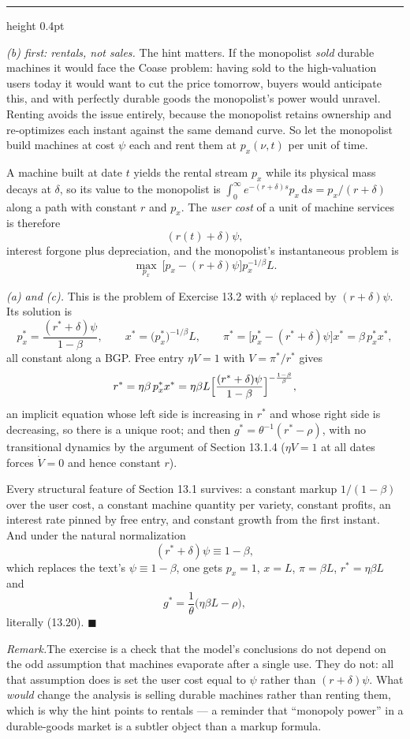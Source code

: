 \documentclass[11pt,letterpaper,reqno]{amsart}
\makeatletter
\newcommand{\dd}{\,\mathrm{d}}
\newcommand{\dt}[1]{\dot{#1}}
\newcommand{\as@head}[3]{%
  \par\addvspace{1.6ex}\penalty-200\relax
  \phantomsection
  \addcontentsline{toc}{subsection}{#1 #2\texorpdfstring{\ifx\relax#3\relax\else\quad #3\fi}{}}%
  {\color{RuleGrey}\hrule height 0.4pt}%
  \nobreak\vspace{0.8ex}\nobreak
  \noindent{\bfseries #1 #2}%
  \ifx\relax#3\relax\else\quad{\bfseries\itshape #3}\fi
  \par\nobreak\vspace{0.4ex}\nobreak
  \as@beginstatement
}
\newcommand{\as@beginstatement}{\begingroup\itshape\ignorespaces}
\newenvironment{aex}[2]{\as@head{Exercise}{#1}{#2}}{\par\addvspace{1.2ex}}
\newcommand{\rmk}[1]{%
  \par\vspace{0.6ex}%
  {\small\noindent\textit{Remark.}\hspace{0.5em}#1\par}%
  \vspace{0.4ex}%
}
\newcommand{\bk}[1]{\textup{\textsc{#1}}}
\renewcommand{\as@beginstatement}{\ignorespaces}
\makeatother
\begin{document}
\begin{aex}{13.23}{}
\emph{(b) first: rentals, not sales.}  The hint matters.  If the monopolist \emph{sold} durable
machines it would face the Coase problem: having sold to the high-valuation users today it would
want to cut the price tomorrow, buyers would anticipate this, and with perfectly durable goods the
monopolist's power would unravel.  Renting avoids the issue entirely, because the monopolist
retains ownership and re-optimizes each instant against the same demand curve.  So let the
monopolist build machines at cost $\psi$ each and rent them at $p_x(\nu,t)$ per unit of time.

A machine built at date $t$ yields the rental stream $p_x$ while its physical mass decays at
$\delta$, so its value to the monopolist is $\int_{0}^{\infty}e^{-(r+\delta)s}p_x\dd s=p_x/(r+\delta)$
along a path with constant $r$ and $p_x$.  The \emph{user cost} of a unit of machine services is
therefore
\[
(r(t)+\delta)\psi ,
\]
interest forgone plus depreciation, and the monopolist's instantaneous problem is
\[
\max_{p_x}\ \bigl[p_x-(r+\delta)\psi\bigr]p_x^{-1/\beta}L .
\]

\emph{(a) and (c).}  This is the problem of Exercise 13.2 with $\psi$ replaced by
$(r+\delta)\psi$.  Its solution is
\[
p_x^{*}=\frac{(r^{*}+\delta)\psi}{1-\beta},
\qquad
x^{*}=\bigl(p_x^{*}\bigr)^{-1/\beta}L,
\qquad
\pi^{*}=\bigl[p_x^{*}-(r^{*}+\delta)\psi\bigr]x^{*}=\beta\,p_x^{*}x^{*} ,
\]
all constant along a BGP.  Free entry $\eta V=1$ with $V=\pi^{*}/r^{*}$ gives
\[
r^{*}=\eta\beta\,p_x^{*}x^{*}=\eta\beta L\Bigl[\frac{(r^{*}+\delta)\psi}{1-\beta}\Bigr]^{-\frac{1-\beta}{\beta}} ,
\]
an implicit equation whose left side is increasing in $r^{*}$ and whose right side is decreasing,
so there is a unique root; and then $g^{*}=\theta^{-1}(r^{*}-\rho)$, with no transitional dynamics
by the argument of Section 13.1.4 ($\eta V=1$ at all dates forces $\dt V=0$ and hence constant
$r$).

Every structural feature of Section 13.1 survives: a constant markup $1/(1-\beta)$ over the user
cost, a constant machine quantity per variety, constant profits, an interest rate pinned by free
entry, and constant growth from the first instant.  And under the natural normalization
\[
(r^{*}+\delta)\psi\equiv1-\beta ,
\]
which replaces the text's $\psi\equiv1-\beta$, one gets $p_x=1$, $x=L$, $\pi=\beta L$,
$r^{*}=\eta\beta L$ and
\[
g^{*}=\frac{1}{\theta}\bigl(\eta\beta L-\rho\bigr) ,
\]
literally \bk{(13.20)}. $\blacksquare$

\rmk{The exercise is a check that the model's conclusions do not depend on the odd assumption that
machines evaporate after a single use.  They do not: all that assumption does is set the user cost
equal to $\psi$ rather than $(r+\delta)\psi$.  What \emph{would} change the analysis is selling
durable machines rather than renting them, which is why the hint points to rentals --- a reminder
that ``monopoly power'' in a durable-goods market is a subtler object than a markup formula.}
\end{aex}
\end{document}
